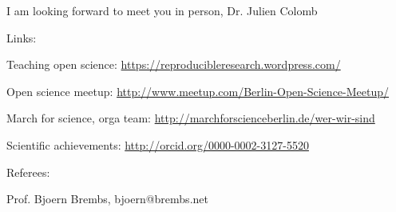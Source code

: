 I am looking forward to meet you in person,
Dr. Julien Colomb

\vspace {1cm} 

Links:

Teaching open science: \url{https://reproducibleresearch.wordpress.com/}

Open science meetup: \url{http://www.meetup.com/Berlin-Open-Science-Meetup/}

March for science, orga team: \url{http://marchforscienceberlin.de/wer-wir-sind}

Scientific achievements: \url{http://orcid.org/0000-0002-3127-5520}

\vspace {0.5cm} 

Referees:

Prof. Bjoern Brembs, bjoern@brembs.net

